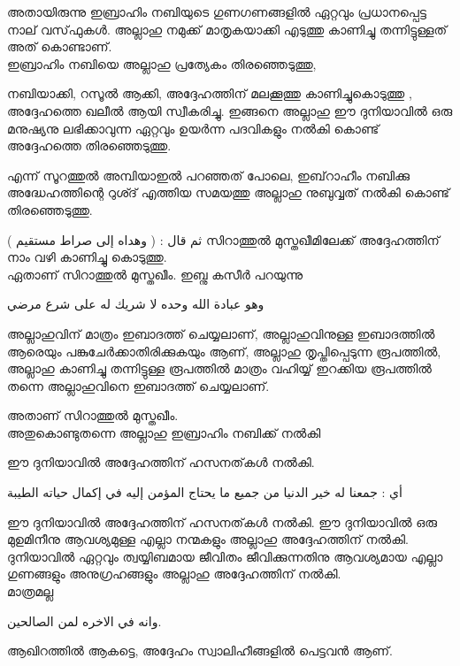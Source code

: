 അതായിരുന്നു ഇബ്രാഹിം നബിയുടെ ഗുണഗണങ്ങളിൽ ഏറ്റവും പ്രധാനപ്പെട്ട നാല് വസ്‌ഫുകൾ. 
അല്ലാഹു നമുക്ക് മാതൃകയാക്കി എടുത്തു കാണിച്ചു തന്നിട്ടുള്ളത് അത് കൊണ്ടാണ്. \\

ഇബ്രാഹിം നബിയെ അല്ലാഹു പ്രത്യേകം തിരഞ്ഞെടുത്തു,  

നബിയാക്കി, റസൂൽ ആക്കി, 
അദ്ദേഹത്തിന് മലക്കൂത്തു കാണിച്ചുകൊടുത്തു , അദ്ദേഹത്തെ ഖലീൽ ആയി സ്വീകരിച്ചു. 
ഇങ്ങനെ അല്ലാഹു ഈ ദുനിയാവിൽ ഒരു മനുഷ്യനു ലഭിക്കാവുന്ന ഏറ്റവും ഉയർന്ന പദവികളും നൽകി കൊണ്ട് അദ്ദേഹത്തെ തിരഞ്ഞെടുത്തു. 

    \textarabic{\quranayah[21][51]} 

എന്ന് സൂറത്തുൽ അമ്പിയാഇൽ പറഞ്ഞത് പോലെ, ഇബ്‌റാഹീം നബിക്കു അദ്ധേഹത്തിന്റെ റുശ്ദ് എത്തിയ സമയത്തു അല്ലാഹു നുബുവ്വത് നൽകി കൊണ്ട് തിരഞ്ഞെടുത്തു.

\textarabic{ثم قال : ( وهداه إلى صراط مستقيم )}
സിറാത്തുൽ മുസ്തഖീമിലേക്ക് അദ്ദേഹത്തിന് നാം വഴി കാണിച്ചു കൊടുത്തു. \\

ഏതാണ് സിറാത്തുൽ മുസ്തഖീം. 
ഇബ്നു കസീർ പറയുന്നു


\textarabic{وهو عبادة الله وحده لا شريك له على شرع مرضي }

അല്ലാഹുവിന് മാത്രം ഇബാദത്ത് ചെയ്യലാണ്, അല്ലാഹുവിനുള്ള ഇബാദത്തിൽ ആരെയും പങ്കുചേർക്കാതിരിക്കുകയും ആണ്,  അല്ലാഹു തൃപ്തിപ്പെടുന്ന രൂപത്തിൽ, അല്ലാഹു കാണിച്ചു തന്നിട്ടുള്ള രൂപത്തിൽ മാത്രം വഹിയ്യ് ഇറക്കിയ രൂപത്തിൽ തന്നെ അല്ലാഹുവിനെ ഇബാദത്ത് ചെയ്യലാണ്. 

അതാണ് സിറാത്തുൽ മുസ്തഖീം. \\


അതുകൊണ്ടുതന്നെ അല്ലാഹു ഇബ്രാഹിം നബിക്ക് നൽകി 

    \textarabic{\quranayah[16][122]} 

ഈ ദുനിയാവിൽ അദ്ദേഹത്തിന് ഹസനത്‌കൾ നൽകി. 

\textarabic{أي : جمعنا له خير الدنيا من جميع ما يحتاج المؤمن إليه في إكمال حياته الطيبة}



ഈ ദുനിയാവിൽ അദ്ദേഹത്തിന് ഹസനത്‌കൾ നൽകി. 
ഈ ദുനിയാവിൽ ഒരു മുഉമിനീനു  ആവശ്യമുള്ള എല്ലാ നന്മകളും അല്ലാഹു അദ്ദേഹത്തിന് നൽകി. ദുനിയാവിൽ ഏറ്റവും ത്വയ്യിബമായ ജീവിതം ജീവിക്കുന്നതിനു ആവശ്യമായ എല്ലാ ഗുണങ്ങളും അനുഗ്രഹങ്ങളും അല്ലാഹു അദ്ദേഹത്തിന് നൽകി. \\

 മാത്രമല്ല 

\textarabic{وانه في الاخره لمن الصالحين.} 

ആഖിറത്തിൽ ആകട്ടെ, അദ്ദേഹം  സ്വാലിഹീങ്ങളിൽ പെട്ടവൻ ആണ്. 

